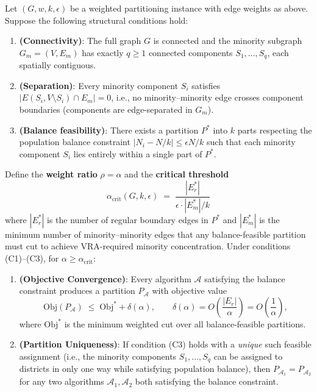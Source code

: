 \begin{theorem}
\label{thm:convergence}
Let $(G, w, k, \epsilon)$ be a weighted partitioning instance with edge weights as above. Suppose the following structural conditions hold:
\begin{enumerate}[label=\textbf{(C\arabic*)}]
    \item \textbf{(Connectivity)}: The full graph $G$ is connected and the minority subgraph $G_m = (V, E_m)$ has exactly $q \geq 1$ connected components $S_1,\ldots,S_q$, each spatially contiguous.
    \item \textbf{(Separation)}: Every minority component $S_i$ satisfies $|E(S_i, V \setminus S_i) \cap E_m| = 0$, i.e., no minority--minority edge crosses component boundaries (components are edge-separated in $G_m$).
    \item \textbf{(Balance feasibility)}: There exists a partition $P^*$ into $k$ parts respecting the population balance constraint $|N_i - N/k| \leq \epsilon N/k$ such that each minority component $S_i$ lies entirely within a single part of $P^*$.
\end{enumerate}
Define the \textbf{weight ratio} $\rho = \alpha$ and the \textbf{critical threshold}
\[
    \alpha_{\text{crit}}(G,k,\epsilon) \;=\; \frac{|E_r^*|}{\epsilon \cdot |E_m^*| / k}
\]
where $|E_r^*|$ is the number of regular boundary edges in $P^*$ and $|E_m^*|$ is the minimum number of minority--minority edges that any balance-feasible partition must cut to achieve VRA-required minority concentration. Under conditions \textup{(C1)--(C3)}, for $\alpha \geq \alpha_{\text{crit}}$:

\begin{enumerate}
    \item \textbf{(Objective Convergence)}: Every algorithm $\mathcal{A}$ satisfying the balance constraint produces a partition $P_\mathcal{A}$ with objective value
    \[
    \mathrm{Obj}(P_{\mathcal{A}}) \;\leq\; \mathrm{Obj}^* + \delta(\alpha),
    \qquad \delta(\alpha) = O\!\left(\frac{|E_r|}{\alpha}\right) = O\!\left(\frac{1}{\alpha}\right),
    \]
    where $\mathrm{Obj}^*$ is the minimum weighted cut over all balance-feasible partitions.

    \item \textbf{(Partition Uniqueness)}: If condition \textup{(C3)} holds with a \emph{unique} such feasible assignment (i.e., the minority components $S_1,\ldots,S_q$ can be assigned to districts in only one way while satisfying population balance), then $P_{\mathcal{A}_1} = P_{\mathcal{A}_2}$ for any two algorithms $\mathcal{A}_1, \mathcal{A}_2$ both satisfying the balance constraint.
\end{enumerate}
\end{theorem}

